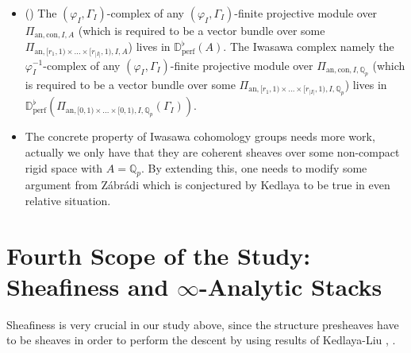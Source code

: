 \documentclass[11pt]{report}
\begin{document}
\begin{itemize}

\justifying
\item<4-> () The $(\varphi_I,\Gamma_I)$-complex of any $(\varphi_I,\Gamma_I)$-finite projective module over $\Pi_{\mathrm{an},\mathrm{con},I,A}$ (which is required to be a vector bundle over some $\Pi_{\mathrm{an},[r_1,1)\times...\times [r_{|I|},1),I,A}$) lives in $\mathbb{D}^\flat_\mathrm{perf}(A)$. The Iwasawa complex namely the $\varphi^{-1}_I$-complex of any $(\varphi_I,\Gamma_I)$-finite projective module over $\Pi_{\mathrm{an},\mathrm{con},I,\mathbb{Q}_p}$ (which is required to be a vector bundle over some $\Pi_{\mathrm{an},[r_1,1)\times...\times [r_{|I|},1),I,\mathbb{Q}_p}$) lives in $\mathbb{D}^\flat_\mathrm{perf}(\Pi_{\mathrm{an},[0,1)\times...\times [0,1),I,\mathbb{Q}_p}(\Gamma_I))$.

\item<5-> The concrete property of Iwasawa cohomology groups needs more work, actually we only have that they are coherent sheaves over some non-compact rigid space with $A=\mathbb{Q}_p$. By extending this, one needs to modify some argument from Z\'abr\'adi \cite[Theorem 3.10]{Z} which is conjectured by Kedlaya to be true in even relative situation.\\	
\end{itemize}
	







\newpage
\section{Fourth Scope of the Study: Sheafiness and $\infty$-Analytic Stacks}

Sheafiness is very crucial in our study above, since the structure presheaves have to be sheaves in order to perform the descent by using results of Kedlaya-Liu \cite[Theorem 2.7.7]{KL1}, \cite[Theorem 2.5.5, Theorem 2.5.14, Section 2.6, Theorem 3.4.8]{KL2}. 
\end{document}
